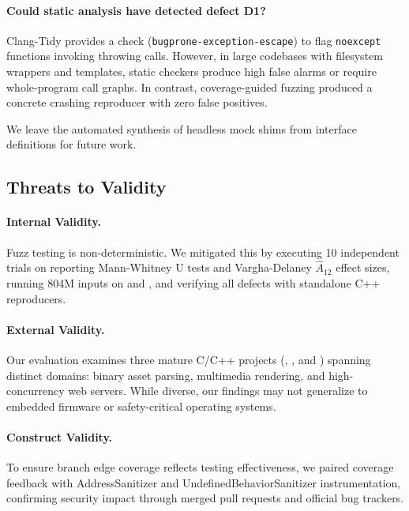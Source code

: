 \paragraph{Could static analysis have detected defect D1?}
Clang-Tidy provides a check (\texttt{bugprone-}\allowbreak\texttt{exception-}\allowbreak\texttt{escape}) to flag \texttt{noexcept} functions invoking throwing calls.
However, in large codebases with filesystem wrappers and templates, static checkers produce high false alarms or require whole-program call graphs.
In contrast, coverage-guided fuzzing produced a concrete crashing reproducer with zero false positives.

We leave the automated synthesis of headless mock shims from interface definitions for future work.

\subsection{Threats to Validity}
\label{sec:threats}

\paragraph{Internal Validity.}
Fuzz testing is non-deterministic.
We mitigated this by executing 10 independent trials on \fastgltf reporting Mann-Whitney U tests and Vargha-Delaney $\hat{A}_{12}$ effect sizes, running 804M inputs on \raylib and \drogon, and verifying all defects with standalone C++ reproducers.

\paragraph{External Validity.}
Our evaluation examines three mature C/C++ projects (\fastgltf, \raylib, and \drogon) spanning distinct domains: binary asset parsing, multimedia rendering, and high-concurrency web servers.
While diverse, our findings may not generalize to embedded firmware or safety-critical operating systems.

\paragraph{Construct Validity.}
To ensure branch edge coverage reflects testing effectiveness, we paired coverage feedback with AddressSanitizer and UndefinedBehaviorSanitizer instrumentation, confirming security impact through merged pull requests and official bug trackers.

